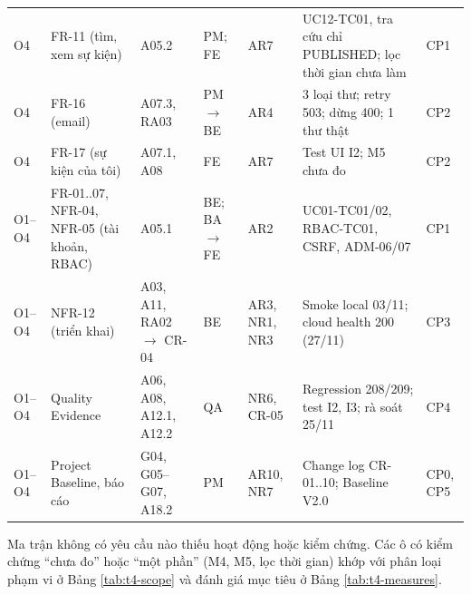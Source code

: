 \begin{longtable}{@{}p{.06\linewidth}p{.16\linewidth}p{.13\linewidth}p{.13\linewidth}p{.11\linewidth}p{.22\linewidth}p{.07\linewidth}@{}}
O4 & FR-11 (tìm, xem sự kiện) & A05.2 & PM; FE & AR7 & UC12-TC01, tra cứu chỉ PUBLISHED; lọc thời gian chưa làm & CP1\\
O4 & FR-16 (email) & A07.3, RA03 & PM $\to$ BE & AR4 & 3 loại thư; retry 503; dừng 400; 1 thư thật & CP2\\
O4 & FR-17 (sự kiện của tôi) & A07.1, A08 & FE & AR7 & Test UI I2; M5 chưa đo & CP2\\
O1--O4 & FR-01..07, NFR-04, NFR-05 (tài khoản, RBAC) & A05.1 & BE; BA $\to$ FE & AR2 & UC01-TC01/02, RBAC-TC01, CSRF, ADM-06/07 & CP1\\
O1--O4 & NFR-12 (triển khai) & A03, A11, RA02 $\to$ CR-04 & BE & AR3, NR1, NR3 & Smoke local 03/11; cloud health 200 (27/11) & CP3\\
O1--O4 & Quality Evidence & A06, A08, A12.1, A12.2 & QA & NR6, CR-05 & Regression 208/209; test I2, I3; rà soát 25/11 & CP4\\
O1--O4 & Project Baseline, báo cáo & G04, G05--G07, A18.2 & PM & AR10, NR7 & Change log CR-01..10; Baseline V2.0 & CP0, CP5\\
\end{longtable}
\endgroup

Ma trận không có yêu cầu nào thiếu hoạt động hoặc kiểm chứng. Các ô có kiểm chứng ``chưa đo'' hoặc ``một phần'' (M4, M5, lọc thời gian) khớp với phân loại phạm vi ở Bảng \ref{tab:t4-scope} và đánh giá mục tiêu ở Bảng \ref{tab:t4-measures}.
